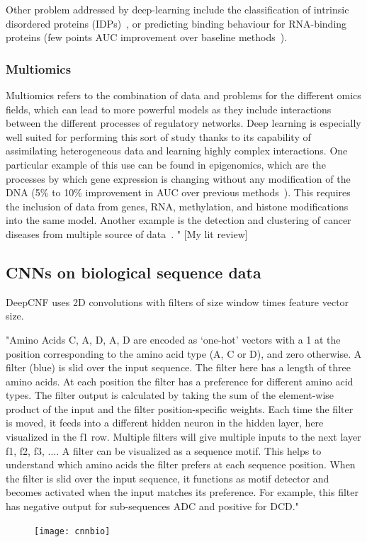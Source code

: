 Other problem addressed by deep-learning include the classification of intrinsic disordered proteins (IDPs)~\cite{Wang2015}, or predicting binding behaviour for RNA-binding proteins (few points AUC improvement over baseline methods~\cite{Zhang2015}).

\subsubsection{Multiomics}
Multiomics refers to the combination of data and problems for the different omics fields, which can lead to more powerful models as they include interactions between the different processes of regulatory networks. Deep learning is especially well suited for performing this sort of study thanks to its capability of assimilating heterogeneous data and learning highly complex interactions. One particular example of this use can be found in epigenomics, which are the processes by which gene expression is changing without any modification of the DNA (5\% to 10\% improvement in AUC over previous methods~\cite{Zhou2015}). This requires the inclusion of data from genes, RNA, methylation, and histone modifications into the same model. Another example is the detection and clustering of cancer diseases from multiple source of data~\cite{Liang2015}.
" [My lit review]

	\subsection{CNNs on biological sequence data}
	DeepCNF uses 2D convolutions with filters of size window times feature vector size.

	"Amino Acids C, A, D, A, D are encoded as ‘one-hot’ vectors with a 1 at the position corresponding to the amino acid type (A, C or D), and zero otherwise. A filter (blue) is slid over the input sequence. The filter here has a length of three amino acids. At each position the filter has a preference for different amino acid types. The filter output is calculated by taking the sum of the element-wise product of the input and the filter position-specific weights. Each time the filter is moved, it feeds into a different hidden neuron in the hidden layer, here visualized in the f1 row. Multiple filters will give multiple inputs to the next layer {f1, f2, f3, ...}. A filter can be visualized as a sequence motif. This helps to understand which amino acids the filter prefers at each sequence position. When the filter is slid over the input sequence, it functions as motif detector and becomes activated when the input matches its preference. For example, this filter has negative output for sub-sequences ADC and positive for DCD." \cite{Jurtz2017}
	\begin{figure}[h]
		\centering
		\texttt{[image: cnnbio]}
	\end{figure}
		
